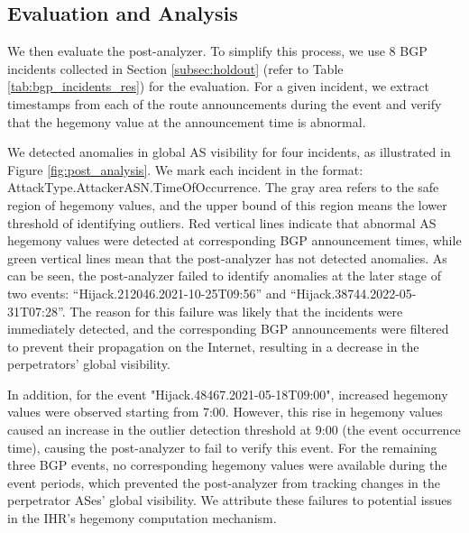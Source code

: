 \vspace{-10pt}
\subsection{Evaluation and Analysis}
We then evaluate the post-analyzer.
To simplify this process, we use 8 BGP incidents collected in Section \ref{subsec:holdout} (refer to Table \ref{tab:bgp_incidents_res}) for the evaluation.
For a given incident, we extract timestamps from each of the route announcements during the event and verify that the hegemony value at the announcement time is abnormal.

We detected anomalies in global AS visibility for four incidents, as illustrated in Figure \ref{fig:post_analysis}.
We mark each incident in the format: AttackType.AttackerASN.TimeOfOccurrence. 
The gray area refers to the safe region of hegemony values, and the upper bound of this region means the lower threshold of identifying outliers.
Red vertical lines indicate that abnormal AS hegemony values were detected at corresponding BGP announcement times, while green vertical lines mean that the post-analyzer has not detected anomalies.
As can be seen, the post-analyzer failed to identify anomalies at the later stage of two events: ``Hijack.212046.2021-10-25T09:56'' and ``Hijack.38744.2022-05-31T07:28''.
The reason for this failure was likely that the incidents were immediately detected, and the corresponding BGP announcements were filtered to prevent their propagation on the Internet, resulting in a decrease in the perpetrators' global visibility.

In addition, for the event "Hijack.48467.2021-05-18T09:00", increased hegemony values were observed starting from 7:00. However, this rise in hegemony values caused an increase in the outlier detection threshold at 9:00 (the event occurrence time), causing the post-analyzer to fail to verify this event.
For the remaining three BGP events, no corresponding hegemony values were available during the event periods, which prevented the post-analyzer from tracking changes in the perpetrator ASes' global visibility.
We attribute these failures to potential issues in the IHR's hegemony computation mechanism.


